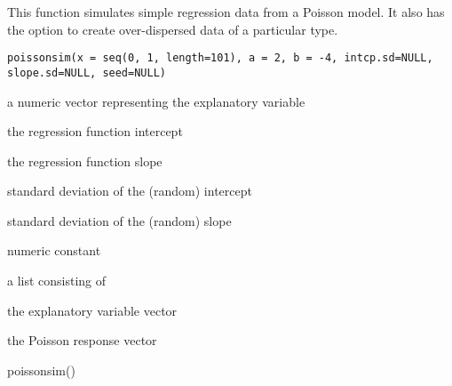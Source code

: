 \begin{Description}\relax
This function simulates simple regression data from a Poisson
model.  It also has the option to create over-dispersed data
of a particular type.
\end{Description}
\begin{Usage}
\begin{verbatim}
poissonsim(x = seq(0, 1, length=101), a = 2, b = -4, intcp.sd=NULL, slope.sd=NULL, seed=NULL)
\end{verbatim}
\end{Usage}
\begin{Arguments}
\begin{ldescription}
\item[\code{x}] a numeric vector representing the explanatory variable
\item[\code{a}] the regression function intercept
\item[\code{b}] the regression function slope
\item[\code{intcp.sd}] standard deviation of the (random) intercept
\item[\code{slope.sd}] standard deviation of the (random) slope
\item[\code{seed}] numeric constant
\end{ldescription}
\end{Arguments}
\begin{Value}
a list consisting of
\begin{ldescription}
\item[\code{x}] the explanatory variable vector
\item[\code{y}] the Poisson response vector
\end{ldescription}
\end{Value}
\begin{Examples}
\begin{ExampleCode}
poissonsim()
\end{ExampleCode}
\end{Examples}

